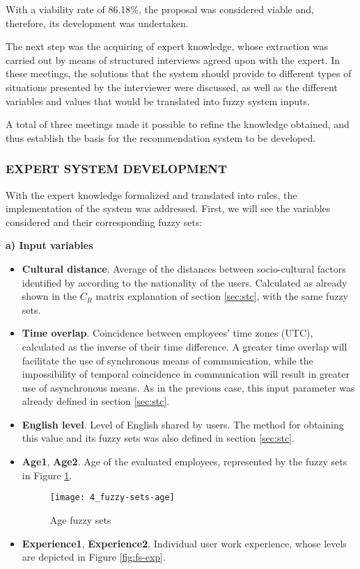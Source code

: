 With a viability rate of 86.18\%, the proposal was considered viable and, therefore, its development was undertaken.

The next step was the acquiring of expert knowledge, whose extraction was carried out by means of structured interviews agreed upon with the expert. In these meetings, the solutions that the system should provide to different types of situations presented by the interviewer were discussed, as well as the different variables and values that would be translated into fuzzy system inputs.

A total of three meetings made it possible to refine the knowledge obtained, and thus establish the basis for the recommendation system to be developed.

\subsubsection{EXPERT SYSTEM DEVELOPMENT}

With the expert knowledge formalized and translated into rules, the implementation of the system was addressed. First, we will see the variables considered and their corresponding fuzzy sets:

\indent \textbf{a) Input variables}

\begin{itemize}
\item \textbf{Cultural distance}. Average of the distances between socio-cultural factors identified by \cite{hofstede_cultures_2004} according to the nationality of the users. Calculated as already shown in the $C_R$ matrix explanation of section \ref{sec:stc}, with the same fuzzy sets.
\item \textbf{Time overlap}.  Coincidence between employees’ time zones (UTC), calculated as the inverse of their time difference. A greater time overlap will facilitate the use of synchronous means of communication, while the impossibility of temporal coincidence in communication will result in greater use of asynchronous means. As in the previous case, this input parameter was already defined in section \ref{sec:stc}.
\item \textbf{English level}. Level of English shared by users. The method for obtaining this value and its fuzzy sets was also defined in section \ref{sec:stc}.
\item \textbf{Age1}, \textbf{Age2}. Age of the evaluated employees, represented by the fuzzy sets in Figure \ref{fig:fs-age}.

	\begin{figure}
		\centering
		\texttt{[image: 4\_fuzzy-sets-age]}
		\caption[Age fuzzy sets]{Age fuzzy sets}
		\label{fig:fs-age}
	\end{figure}

\item \textbf{Experience1}, \textbf{Experience2}. Individual user work experience, whose levels are depicted in Figure \ref{fig:fs-exp}.
\end{itemize}

